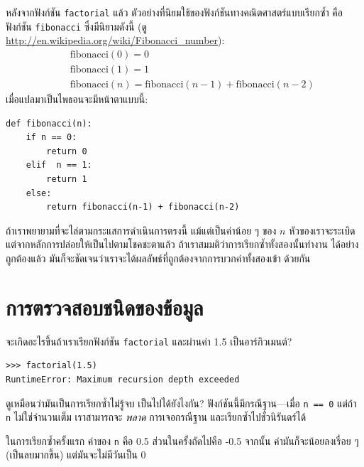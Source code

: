 
หลังจากฟังก์ชัน {\tt factorial} แล้ว ตัวอย่างที่นิยมใช้ของฟังก์ชันทางคณิตศาสตร์แบบเรียกซ้ำ คือ ฟังก์ชัน {\tt fibonacci}
ซึ่งมีนิยามดังนี้ (ดู \url{http://en.wikipedia.org/wiki/Fibonacci_number}):
%
\begin{eqnarray*}
&& \mathrm{fibonacci}(0) = 0 \\
&& \mathrm{fibonacci}(1) = 1 \\
&& \mathrm{fibonacci}(n) = \mathrm{fibonacci}(n-1) + \mathrm{fibonacci}(n-2)
\end{eqnarray*}
%
เมื่อแปลมาเป็นไพธอนจะมีหน้าตาแบบนี้:

\begin{verbatim}
def fibonacci(n):
    if n == 0:
        return 0
    elif  n == 1:
        return 1
    else:
        return fibonacci(n-1) + fibonacci(n-2)
\end{verbatim}
%
ถ้าเราพยายามที่จะไล่ตามกระแสการดำเนินการตรงนี้ แม้แต่เป็นค่าน้อย ๆ ของ $n$ หัวของเราจะระเบิด
แต่จากหลักการปล่อยให้เป็นไปตามโชคชะตาแล้ว ถ้าเราสมมติว่าการเรียกซ้ำทั้งสองนั้นทำงาน
ได้อย่างถูกต้องแล้ว มันก็จะชัดเจนว่าเราจะได้ผลลัพธ์ที่ถูกต้องจากการบวกค่าทั้งสองเข้า
ด้วยกัน


\section{การตรวจสอบชนิดของข้อมูล} %
\label{guardian}

จะเกิดอะไรขึ้นถ้าเราเรียกฟังก์ชัน {\tt factorial} และผ่านค่า 1.5 เป็นอาร์กิวเมนต์?

\begin{verbatim}
>>> factorial(1.5)
RuntimeError: Maximum recursion depth exceeded
\end{verbatim}
% 
ดูเหมือนว่ามันเป็นการเรียกซ้ำไม่รู้จบ เป็นไปได้ยังไงกัน? ฟังก์ชันนี้มีกรณีฐาน---เมื่อ {\tt n == 0}
แต่ถ้า {\tt n} ไม่ใช่จำนวนเต็ม เราสามารถจะ {\em พลาด} การเจอกรณีฐาน และเรียกซ้ำไปชั่วนิรันดร์ได้

ในการเรียกซ้ำครั้งแรก ค่าของ {\tt n} คือ 0.5 ส่วนในครั้งถัดไปคือ -0.5
จากนั้น ค่ามันก็จะน้อยลงเรื่อย ๆ (เป็นลบมากขึ้น) แต่มันจะไม่มีวันเป็น 0

